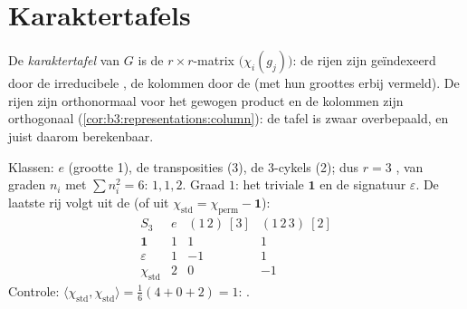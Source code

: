 \section{Karaktertafels}

\begin{definition}\label{def:b3:representations:table}
De \emph{karaktertafel} van $G$ is de $r
\times r$-matrix $\bigl(\chi_i(g_j)\bigr)$: de rijen zijn
geïndexeerd door de irreducibele , de kolommen door de
 (met hun groottes erbij vermeld). De rijen zijn
orthonormaal voor het gewogen product en de kolommen zijn
orthogonaal (\cref{cor:b3:representations:column}): de tafel is
zwaar overbepaald, en juist daarom berekenbaar.
\end{definition}

\begin{example}\label{ex:b3:representations:s3}
Klassen: $e$ (grootte 1), de transposities (3), de $3$-cykels (2);
dus $r = 3$ , van graden $n_i$ met
$\sum n_i^2 = 6$: $1, 1, 2$. Graad $1$: het triviale 
$\mathbf 1$ en de signatuur $\varepsilon$. De laatste rij volgt
uit de  (of uit $\chi_{\mathrm{std}} =
\chi_{\mathrm{perm}} - \mathbf 1$):
\[
\begin{array}{c|ccc}
S_3 & e & (1\,2)\ [3] & (1\,2\,3)\ [2]\\
\hline
\mathbf 1 & 1 & 1 & 1\\
\varepsilon & 1 & -1 & 1\\
\chi_{\mathrm{std}} & 2 & 0 & -1
\end{array}
\]
Controle: $\langle\chi_{\mathrm{std}},\chi_{\mathrm{std}}\rangle =
\frac{1}{6}(4 + 0 + 2) = 1$: .
\end{example}

